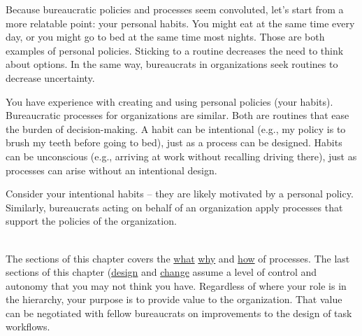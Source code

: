 
Because bureaucratic policies and processes seem convoluted, let's start from a more relatable point: your personal habits.
You might eat at the same time every day, or you might go to bed at the same time most nights. Those are both examples of personal policies. Sticking to a routine decreases the need to think about options. In the same way, bureaucrats in organizations seek routines to decrease uncertainty. 

You have experience with creating and using personal policies (your habits).  Bureaucratic processes for organizations are similar.
Both are routines that ease the burden of decision-making. A habit can be intentional (e.g., my policy is to brush my teeth before going to bed), just as a process can be designed. Habits can be unconscious (e.g., arriving at work without recalling driving there), just as processes can arise without an intentional design. 

Consider your intentional habits -- they are likely motivated by a personal policy. Similarly, bureaucrats acting on behalf of an organization apply processes that support the policies of the organization.

\ \\

The sections of this chapter covers 
the \hyperref[sec:definition-of-process]{what}%
\iftoggle{haspagenumbers}{ (page~\pageref{sec:definition-of-process}), }{,}%
\hyperref[sec:why-processes-exist]{why}%
\iftoggle{haspagenumbers}{ (page~\pageref{sec:why-processes-exist}), }{,}%
and 
\hyperref[sec:process-chaos]{how}%
\iftoggle{haspagenumbers}{ (page~\pageref{sec:process-chaos}) }{}%
of processes. 
The last sections of this chapter 
(\hyperref[sec:design-of-processes]{design}%
\iftoggle{haspagenumbers}{ on page~\pageref{sec:design-of-processes} }{}%
and 
\hyperref[sec:change-a-process]{change}%
\iftoggle{haspagenumbers}{ on page~\pageref{sec:change-a-process})}{)}
assume a level of control and autonomy that you may not think you have. Regardless of where your role is in the hierarchy, your purpose is to provide value to the organization. That value can be negotiated with fellow bureaucrats on improvements to the design of task workflows. 

